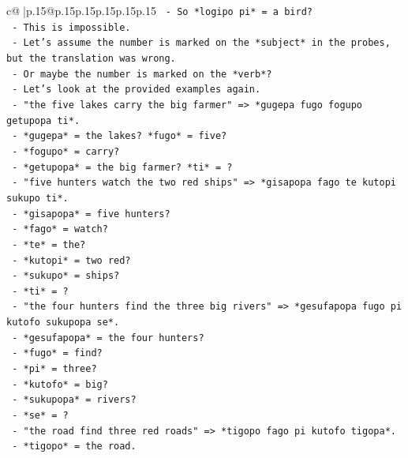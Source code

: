 \documentclass{article}
\begin{document}
{\begin{supertabular}{c@{$\;$}|p{.15\linewidth}@{}p{.15\linewidth}p{.15\linewidth}p{.15\linewidth}p{.15\linewidth}p{.15\linewidth}}
{{{\texttt{                {-} So *logipo pi* = a bird?} \\
\texttt{                {-} This is impossible.} \\
\texttt{            {-} Let's assume the number is marked on the *subject* in the probes, but the translation was wrong.} \\
\texttt{            {-} Or maybe the number is marked on the *verb*?} \\
\texttt{            {-} Let's look at the provided examples again.} \\
\texttt{            {-} "the five lakes carry the big farmer" => *gugepa fugo fogupo getupopa ti*.} \\
\texttt{              {-} *gugepa* = the lakes? *fugo* = five?} \\
\texttt{              {-} *fogupo* = carry?} \\
\texttt{              {-} *getupopa* = the big farmer? *ti* = ?} \\
\texttt{            {-} "five hunters watch the two red ships" => *gisapopa fago te kutopi sukupo ti*.} \\
\texttt{              {-} *gisapopa* = five hunters?} \\
\texttt{              {-} *fago* = watch?} \\
\texttt{              {-} *te* = the?} \\
\texttt{              {-} *kutopi* = two red?} \\
\texttt{              {-} *sukupo* = ships?} \\
\texttt{              {-} *ti* = ?} \\
\texttt{            {-} "the four hunters find the three big rivers" => *gesufapopa fugo pi kutofo sukupopa se*.} \\
\texttt{              {-} *gesufapopa* = the four hunters?} \\
\texttt{              {-} *fugo* = find?} \\
\texttt{              {-} *pi* = three?} \\
\texttt{              {-} *kutofo* = big?} \\
\texttt{              {-} *sukupopa* = rivers?} \\
\texttt{              {-} *se* = ?} \\
\texttt{            {-} "the road find three red roads" => *tigopo fago pi kutofo tigopa*.} \\
\texttt{              {-} *tigopo* = the road.} \\
}}}
\end{supertabular}}
\end{document}
